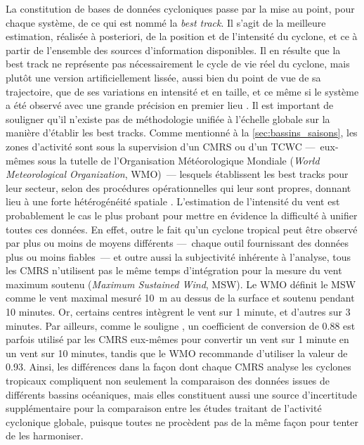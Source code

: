 \documentclass[../main.tex]{subfiles}
\begin{document}
La constitution de bases de données cycloniques passe par la mise au point, pour chaque système, de ce qui est nommé la \textit{best track}. Il s'agit de la meilleure estimation, réalisée à posteriori, de la position et de l'intensité du cyclone, et ce à partir de l'ensemble des sources d'information disponibles. Il en résulte que la best track ne représente pas nécessairement le cycle de vie réel du cyclone, mais plutôt une version artificiellement lissée, aussi bien du point de vue de sa trajectoire,
que de ses variations en intensité et en taille, et ce même si le système a été observé avec une grande précision en premier lieu \parencite{landsea_atlantic_2013}. Il est important de souligner qu'il n'existe pas de méthodologie unifiée à l'échelle globale sur la manière d'établir les best tracks. Comme mentionné à la \cref{sec:bassins_saisons}, les zones d'activité sont sous la supervision d'un CMRS ou d'un TCWC ---~eux-mêmes sous la tutelle de l'Organisation Météorologique Mondiale (\textit{World
Meteorological Organization}, WMO)~--- lesquels établissent les best tracks pour leur secteur, selon des procédures opérationnelles qui leur sont propres, donnant lieu à une forte hétérogénéité spatiale \parencite{schreck_impact_2014}. L'estimation de l'intensité du vent est probablement le cas le plus probant pour mettre en évidence la difficulté à unifier toutes ces données. En effet, outre le fait qu'un cyclone tropical peut être observé par plus ou moins de moyens différents ---~chaque outil fournissant des données plus ou moins fiables~--- et outre aussi la
subjectivité inhérente à l'analyse, tous les CMRS
n'utilisent pas le même temps d'intégration pour la mesure du vent maximum soutenu (\textit{Maximum Sustained Wind}, MSW). Le WMO définit le MSW comme le vent maximal mesuré \SI{10}{\meter} au dessus de la surface et soutenu pendant \num{10} minutes. Or, certains centres intègrent le vent sur \num{1} minute, et d'autres sur \num{3} minutes. Par ailleurs, comme le souligne \cite{knapp_international_2010}, un coefficient de conversion de \num{0.88} est parfois utilisé
par les CMRS eux-mêmes pour convertir un vent sur \num{1} minute en un vent sur \num{10} minutes, tandis que le WMO recommande d'utiliser la valeur de \num{0.93}. Ainsi, les différences dans la façon dont chaque CMRS analyse les cyclones tropicaux compliquent non seulement la comparaison des données issues de différents bassins océaniques, mais elles constituent aussi une source d'incertitude supplémentaire pour la comparaison entre les études traitant de l'activité cyclonique globale, puisque toutes ne procèdent pas de la même
façon pour tenter de les harmoniser.
\end{document}
